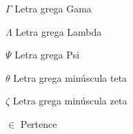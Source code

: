 \begin{simbolos}
  \item[$ \Gamma $] Letra grega Gama
  \item[$ \Lambda $] Letra grega Lambda
  \item[$ \Psi $] Letra grega Psi
  \item[$ \theta $] Letra grega minúscula teta
  \item[$ \zeta $] Letra grega minúscula zeta
  \item[$ \in $] Pertence
\end{simbolos}

